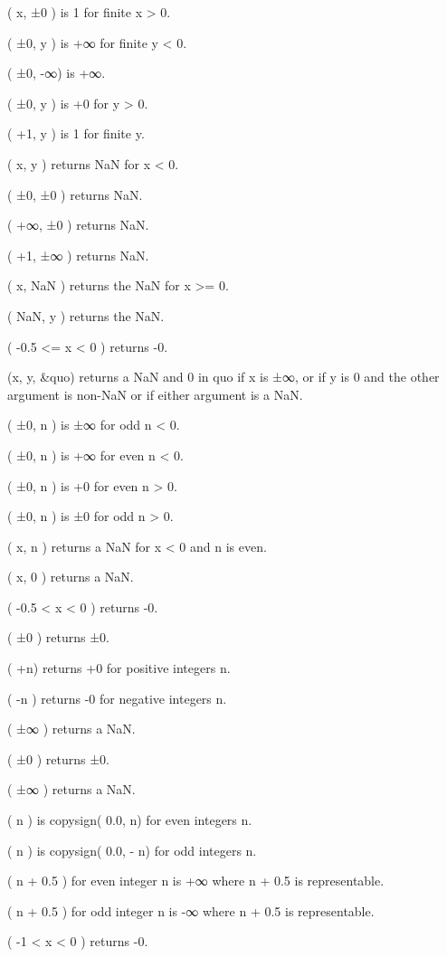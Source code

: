 \blank
{} ( x, ±0 ) is 1 for finite x > 0.\par
{} ( ±0, y ) is +∞ for finite y < 0.\par
{} ( ±0, -∞) is +∞.\par
{} ( ±0, y ) is +0 for y > 0.\par
{} ( +1, y ) is 1 for finite y.\par
{} ( x, y ) returns NaN for x < 0.\par
{} ( ±0, ±0 ) returns NaN.\par
{} ( +∞, ±0 ) returns NaN.\par
{} ( +1, ±∞ ) returns NaN.\par
{} ( x, NaN ) returns the NaN for x >= 0.\par
{} ( NaN, y ) returns the NaN.\par
\blank
{} ( -0.5 <= x < 0 ) returns -0.\par
\blank
{} (x, y, &quo) returns a NaN and 0 in quo if x is ±∞,
or if y is 0 and the other argument is non-NaN or if either argument is a NaN.\par
\blank
{} ( ±0, n ) is ±∞ for odd n < 0.\par
{} ( ±0, n ) is +∞ for even n < 0.\par
{} ( ±0, n ) is +0 for even n > 0.\par
{} ( ±0, n ) is ±0 for odd n > 0.\par
{} ( x, n ) returns a NaN for x < 0 and n is even.\par
{} ( x, 0 ) returns a NaN.\par
\blank
{} ( -0.5 < x < 0 ) returns -0.\par
\blank
{} ( ±0 ) returns ±0.\par
{} ( +n) returns +0 for positive integers n.\par
{} ( -n ) returns -0 for negative integers n.\par
{} ( ±∞ ) returns a NaN.\par
\blank
{} ( ±0 ) returns ±0.\par
{} ( ±∞ ) returns a NaN.\par
{} ( n ) is copysign( 0.0, n) for even integers n.\par
{} ( n ) is copysign( 0.0, - n) for odd integers n.\par
{} ( n + 0.5 ) for even integer n is +∞ where n + 0.5 is representable.\par
{} ( n + 0.5 ) for odd integer n is -∞ where n + 0.5 is representable.\par
\blank
{} ( -1 < x < 0 ) returns -0.\par

